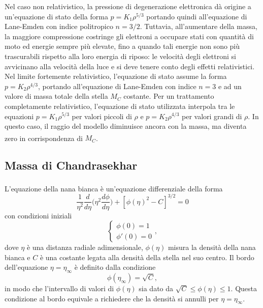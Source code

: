 \documentclass{article}
\newcommand{\supcite}[2][]{\textsuperscript{\cite[#1]{#2}}}
\numberwithin{equation}{section}
\begin{document}
Nel caso non relativistico, la pressione di degenerazione elettronica dà origine a un'equazione di stato della forma $p = K_1\rho^{5/3}$ portando quindi all'equazione di Lane-Emden con indice politropico $n = 3/2$. Tuttavia, all'aumentare della massa, la maggiore compressione costringe gli elettroni a occupare stati con quantità di moto ed energie sempre più elevate, fino a quando tali energie non sono più trascurabili rispetto alla loro energia di riposo: le velocità degli elettroni si avvicinano alla velocità della luce e si deve tenere conto degli effetti relativistici. Nel limite fortemente relativistico, l'equazione di stato assume la forma $p = K_2\rho^{4/3}$, portando all'equazione di Lane-Emden con indice $n = 3$ e ad un valore di massa totale della stella $M_C$ costante. Per un trattamento completamente relativistico, l'equazione di stato utilizzata interpola tra le equazioni $p = K_1\rho^{5/3}$ per valori piccoli di $\rho $ e $p = K_2\rho^{4/3}$ per valori grandi di $\rho $. In questo caso, il raggio del modello diminuisce ancora con la massa, ma diventa zero in corrispondenza di $M_C$\supcite[cap.~XI]{chandrasekhar1957}.

\subsection{Massa di Chandrasekhar}
L'equazione della nana bianca\supcite[pgg.~208-209]{chandrasekhar1935} è un'equazione differenziale della forma 
\begin{equation}
\label{eq: equazione della nana bianca}
    \frac{1}{\eta^2}\frac{d}{d\eta}\bigg(\eta^2\frac{d\phi}{d\eta}\bigg) + [\phi(\eta)^2 - C]^{3/2} = 0
\end{equation}
con condizioni iniziali 
\begin{equation}
    \begin{cases}
        \phi(0) = 1 \\
        \phi'(0) = 0
    \end{cases},
\end{equation}
dove $\eta$ è una distanza radiale adimensionale, $\phi(\eta)$ misura la densità della nana bianca e $C$ è una costante legata alla densità della stella nel suo centro. Il bordo dell'equazione $\eta = \eta_\infty$ è definito dalla condizione 
\begin{equation}
    \phi(\eta_\infty) = \sqrt{C},
\end{equation}
in modo che l'intervallo di valori di $\phi(\eta)$ sia dato da $\sqrt{C} \le \phi(\eta) \le 1$. Questa condizione al bordo equivale a richiedere che la densità si annulli per $\eta = \eta_\infty$.
\end{document}
